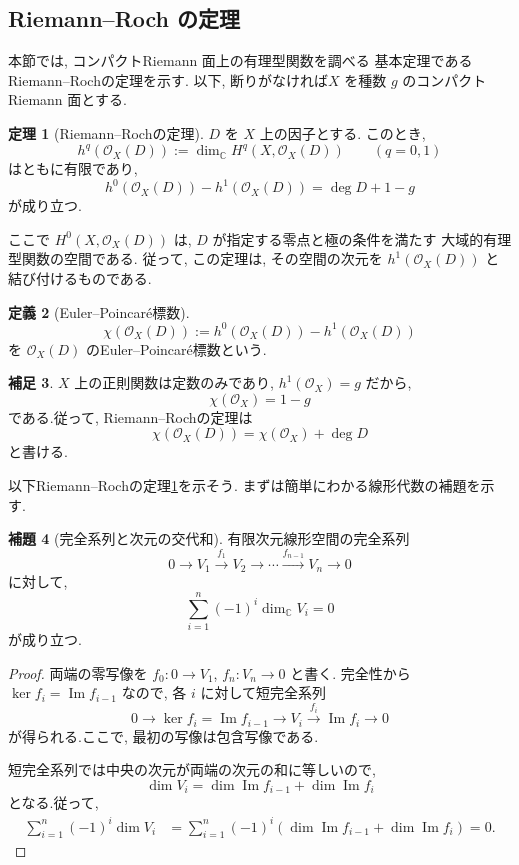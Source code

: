 \documentclass[dvipdfmx,a4paper,11pt]{article} %
\newcommand{\C}{\mathbb{C}}
\theoremstyle{definition}
\newtheorem{thm}{定理}[section]
\numberwithin{equation}{section}
\newtheorem{lem}[thm]{補題}
\newtheorem{dfn}[thm]{定義}
\newtheorem{rem}[thm]{補足}
\begin{document}
\subsection{Riemann--Roch の定理}\label{O-S047}

本節では, コンパクトRiemann 面上の有理型関数を調べる
基本定理であるRiemann--Rochの定理を示す.
以下, 断りがなければ$X$ を種数 $g$ のコンパクトRiemann 面とする.

\begin{thm}[Riemann--Rochの定理]\label{O-M268}
$D$ を $X$ 上の因子とする.
このとき, 
\[
h^q(\mathcal O_X(D))
:=\dim_{\C}H^q(X,\mathcal O_X(D))
\qquad(q=0,1)
\]
はともに有限であり, 
\[
h^0(\mathcal O_X(D))-h^1(\mathcal O_X(D))
=\deg D+1-g
\]
が成り立つ.
\end{thm}

ここで $H^0(X,\mathcal O_X(D))$ は, 
$D$ が指定する零点と極の条件を満たす
大域的有理型関数の空間である.
従って, この定理は, その空間の次元を
$h^1(\mathcal O_X(D))$ と結び付けるものである.

\begin{dfn}[Euler--Poincaré標数]\label{O-M269}
\[
\chi(\mathcal O_X(D))
:=h^0(\mathcal O_X(D))-h^1(\mathcal O_X(D))
\]
を $\mathcal O_X(D)$ のEuler--Poincaré標数という.
\end{dfn}

\begin{rem}
$X$ 上の正則関数は定数のみであり, 
$h^1(\mathcal O_X)=g$ だから, 
\[
\chi(\mathcal O_X)=1-g
\]
である.従って, Riemann--Rochの定理は
\[
\chi(\mathcal O_X(D))
=\chi(\mathcal O_X)+\deg D
\]
と書ける.

\end{rem}
以下Riemann--Rochの定理\ref{O-M268}を示そう. 
まずは簡単にわかる線形代数の補題を示す. 

\begin{lem}[完全系列と次元の交代和]\label{O-M270}
有限次元線形空間の完全系列
\[
0\longrightarrow V_1\xrightarrow{f_1}V_2
\longrightarrow\cdots
\xrightarrow{f_{n-1}}V_n\longrightarrow0
\]
に対して, 
\[
\sum_{i=1}^n(-1)^i\dim_{\C}V_i=0
\]
が成り立つ.
\end{lem}

\begin{proof}
両端の零写像を $f_0:0\to V_1$, $f_n:V_n\to0$ と書く.
完全性から $\ker f_i=\operatorname{Im}f_{i-1}$ なので, 
各 $i$ に対して短完全系列
\[
0\longrightarrow \ker f_i=\operatorname{Im}f_{i-1}
\longrightarrow V_i
\xrightarrow{f_i}\operatorname{Im}f_i
\longrightarrow0
\]
が得られる.ここで, 最初の写像は包含写像である.

短完全系列では中央の次元が両端の次元の和に等しいので, 
\[
\dim V_i
=\dim\operatorname{Im}f_{i-1}
+\dim\operatorname{Im}f_i
\]
となる.従って, 
\[
\begin{aligned}
\sum_{i=1}^n(-1)^i\dim V_i
&=\sum_{i=1}^n(-1)^i
\left(
\dim\operatorname{Im}f_{i-1}
+\dim\operatorname{Im}f_i
\right)
=0.
\end{aligned}
\]
\end{proof}
\end{document}

